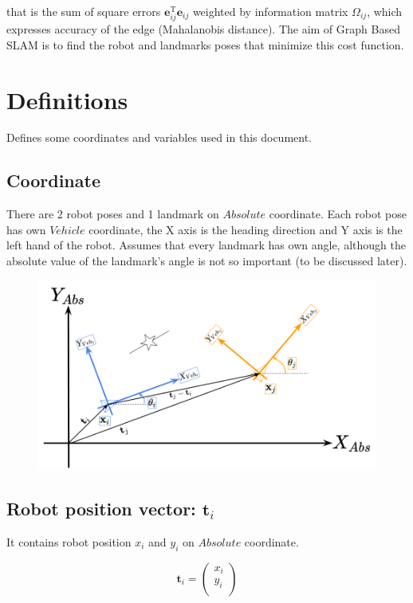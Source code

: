 \documentclass{article}
\begin{document}
that is the sum of square errors $\bm{e}_{ij}^{\mathrm{T}} \bm{e}_{ij}$ weighted by information matrix $\Omega_{ij}$, which expresses accuracy of the edge (Mahalanobis distance).
The aim of Graph Based SLAM is to find the robot and landmarks poses that minimize this cost function.

\newpage

\section{Definitions}

Defines some coordinates and variables used in this document.

\subsection{Coordinate}

There are 2 robot poses and 1 landmark on $Absolute$ coordinate.
Each robot pose has own $Vehicle$ coordinate, the X axis is the heading direction and Y axis is the left hand of the robot.
Assumes that every landmark has own angle, although the absolute value of the landmark's angle is not so important (to be discussed later).

\begin{figure}[h!]
  \centering
  \includegraphics[width=\textwidth]{2-1_coordinate.png}
\end{figure}

\subsection{Robot position vector: $\bm{t}_i$}

It contains robot position $x_i$ and $y_i$ on $Absolute$ coordinate.

\[
\bm{t}_i =
\left(
  \begin{array}{c}
    x_i \\
    y_i \\
  \end{array}
\right)
\]
\end{document}
